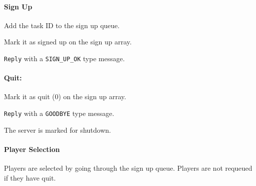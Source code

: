 \documentclass[letterpaper]{article}
\begin{document}
\paragraph{Sign Up%
  \label{sign-up}%
}
\setcounter{listcnt0}{0}
\begin{list}{.}
{
\setlength{\rightmargin}{\leftmargin}
}

\item Add the task ID to the sign up queue.

\item Mark it as signed up on the sign up array.

\item \texttt{Reply} with a \texttt{SIGN\_UP\_OK} type message.
\end{list}


\paragraph{Quit:%
  \label{quit}%
}
\setcounter{listcnt0}{0}
\begin{list}{.}
{
\setlength{\rightmargin}{\leftmargin}
}

\item Mark it as quit (0) on the sign up array.

\item \texttt{Reply} with a \texttt{GOODBYE} type message.

\item The server is marked for shutdown.
\end{list}


\paragraph{Player Selection%
  \label{player-selection}%
}

Players are selected by going through the sign up queue. Players are not requeued if they have quit.
\end{document}
